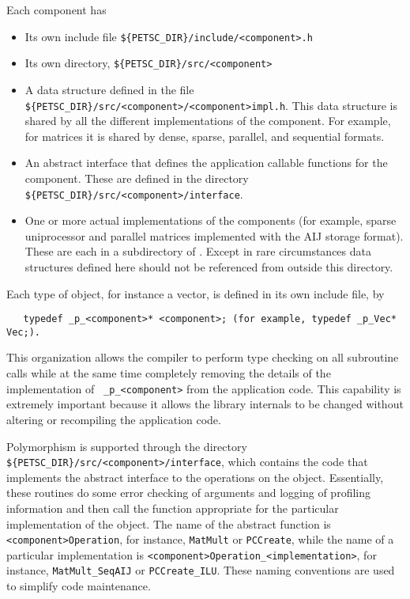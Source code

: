 Each component has
\begin{itemize}
\item Its own include file {\tt \$\{PETSC\_DIR\}/include/<component>.h} 
\item Its own directory, {\tt \$\{PETSC\_DIR\}/src/<component>}
\item A data structure defined in  the file
      {\tt \$\{PETSC\_DIR\}/src/<component>/<component>impl.h}.
      This data structure is shared by all the different implementations of the 
      component. For example, for matrices it is shared by dense,
      sparse, parallel, and sequential formats.
\item An abstract interface that defines the application callable 
      functions for the component. These are defined in the directory
      {\tt \$\{PETSC\_DIR\}/src/<component>/interface}.
\item One or more actual implementations of the components (for example,
      sparse uniprocessor and parallel matrices implemented with the AIJ storage format).
      These are each in a subdirectory of 
      . Except in rare
      circumstances data 
      structures defined here should not be referenced from outside this 
      directory.
\end{itemize}

Each type of object, for instance a vector, is defined in its own
include file, by 
\begin{verbatim}
   typedef _p_<component>* <component>; (for example, typedef _p_Vec* Vec;).
\end{verbatim}
  This organization
allows the compiler to perform type checking on all subroutine calls
while at the same time
completely removing the details of the implementation of {\tt
\_p\_<component>} from the application code.  This capability is extremely important
because it allows the library internals to be changed
without altering or recompiling the application code.

Polymorphism is supported through the directory 
{\tt \$\{PETSC\_DIR\}/src/<component>/interface},
which contains the code that implements the abstract interface to the
operations on the object.  Essentially, these routines do some error
checking of arguments and logging of profiling information 
and then call the function appropriate for the
particular implementation of the object. The name of the abstract
function is {\tt <component>Operation}, for instance, {\tt MatMult} or {\tt PCCreate}, while
the name of a particular implementation is 
{\tt <component>Operation\_<implementation>}, for instance, 
{\tt MatMult\_SeqAIJ} or {\tt PCCreate\_ILU}. These naming
conventions are used to simplify code maintenance.

